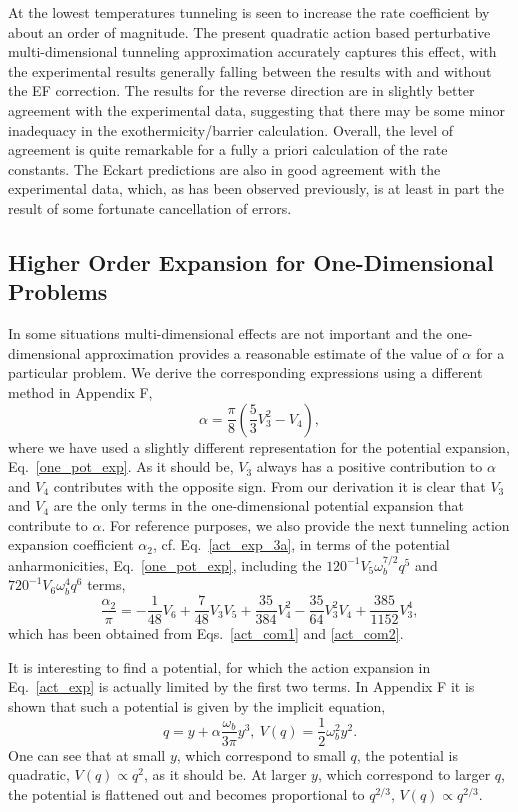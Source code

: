 \documentclass[journal=jpcafh,manuscript=article]{achemso}
\begin{document}
At the lowest temperatures tunneling is seen to increase the rate
coefficient by about an order of magnitude. The present quadratic action
based perturbative multi-dimensional tunneling approximation accurately
captures this effect, with the experimental results generally falling
between the results with and without the EF correction. The results for
the reverse direction are in slightly better agreement with the
experimental data, suggesting that there may be some minor inadequacy in
the exothermicity/barrier calculation. Overall, the level of agreement
is quite remarkable for a fully a priori calculation of the rate
constants. The Eckart predictions are also in good agreement with the
experimental data, which, as has been observed previously, is at least
in part the result of some fortunate cancellation of errors.

\subsection{Higher Order Expansion for One-Dimensional Problems}

In some situations multi-dimensional effects are not important and
the one-dimensional approximation provides a reasonable
estimate of the value of $\alpha$ for a particular problem. We
derive the corresponding expressions using a different method in
Appendix F,
\begin{equation}
  \label{alpha_res}
  \alpha =\frac{\pi}{8}\left(\frac{5}{3}V_3^2-V_4\right),
\end{equation}
where we have used a slightly different representation for the
potential expansion, Eq.~\ref{one_pot_exp}.  As it should be, $V_3$
always has a positive contribution to $\alpha$ and $V_4$ contributes
with the opposite sign.  From our derivation it is clear that $V_3$
and $V_4$ are the only terms in the one-dimensional potential
expansion that contribute to $\alpha$. For reference purposes, we also
provide the next tunneling action expansion coefficient $\alpha_2$,
cf.  Eq.~\ref{act_exp_3a}, in terms of the potential anharmonicities,
Eq.~\ref{one_pot_exp}, including the $120^{-1}V_5\omega_b^{7/2}q^5$
and $720^{-1}V_6\omega_b^4q^6$ terms,
\begin{equation}
  \label{alpha2}
 \frac{\alpha_2}{\pi}=-\frac{1}{48}V_6+\frac{7}{48}V_3V_5
+\frac{35}{384}V_4^2-\frac{35}{64}V_3^2V_4+\frac{385}{1152}V_3^4,
\end{equation}
which has been obtained from Eqs.~\ref{act_com1} and \ref{act_com2}. 

It is interesting to find a potential, for which the action expansion
in Eq.~\ref{act_exp} is actually limited by the first two terms. In
Appendix F it is shown that such a potential is given by the implicit
equation,
\begin{equation}
  \label{act_mod6}
  q=y+\alpha\frac{\omega_b}{3\pi}y^3,\ V(q)=\frac{1}{2}\omega_b^2y^2.
\end{equation}
One can see that at small $y$, which correspond to small $q$, the
potential is quadratic, $V(q)\propto q^2$, as it should be. At larger
$y$, which correspond to larger $q$, the potential is flattened out and
becomes proportional to $q^{2/3}$, $V(q)\propto q^{2/3}$.
\end{document}
